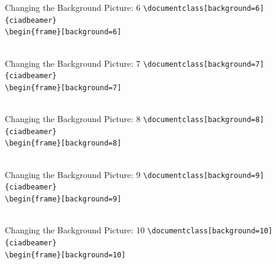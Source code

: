 \documentclass[english,sectioncirclenumberstyle]{ciadbeamer}
\begin{document}
\begin{frame}[t]{{Changing the Background Picture:} 6}
	\texttt{{\textbackslash}documentclass[background=6]\{ciadbeamer\}} \\[.25cm]
	\texttt{{\textbackslash}begin\{frame\}[background=6]} \\[.25cm]
	\centering{} \\[.25cm]
\end{frame}

\begin{frame}[t]{{Changing the Background Picture:} 7}
	\texttt{{\textbackslash}documentclass[background=7]\{ciadbeamer\}} \\[.25cm]
	\texttt{{\textbackslash}begin\{frame\}[background=7]} \\[.25cm]
	\centering{} \\[.25cm]
\end{frame}

\begin{frame}[t]{{Changing the Background Picture:} 8}
	\texttt{{\textbackslash}documentclass[background=8]\{ciadbeamer\}} \\[.25cm]
	\texttt{{\textbackslash}begin\{frame\}[background=8]} \\[.25cm]
	\centering{} \\[.25cm]
\end{frame}

\begin{frame}[t]{{Changing the Background Picture:} 9}
	\texttt{{\textbackslash}documentclass[background=9]\{ciadbeamer\}} \\[.25cm]
	\texttt{{\textbackslash}begin\{frame\}[background=9]} \\[.25cm]
	\centering{} \\[.25cm]
\end{frame}

\begin{frame}[t]{{Changing the Background Picture:} 10}
	\texttt{{\textbackslash}documentclass[background=10]\{ciadbeamer\}} \\[.25cm]
	\texttt{{\textbackslash}begin\{frame\}[background=10]} \\[.25cm]
	\centering{} \\[.25cm]
\end{frame}
\end{document}

